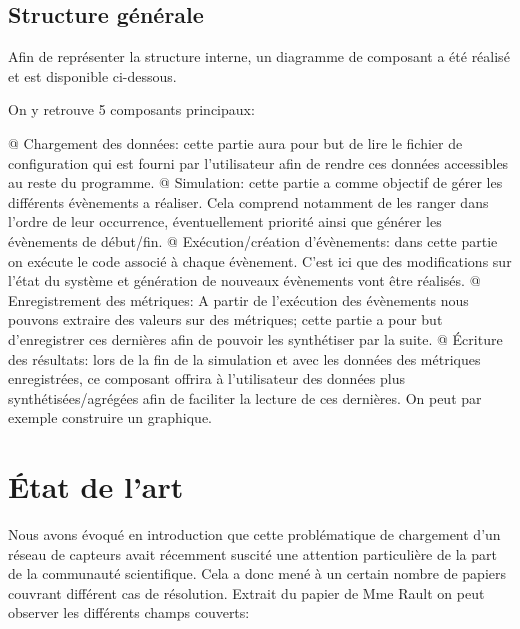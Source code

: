 \documentclass[final]{polytech/polytech}
\begin{document}
			
	\section{Structure générale}
		Afin de représenter la structure interne, un diagramme de composant a été réalisé et est disponible ci-dessous.
		
		
		On y retrouve 5 composants principaux:
		\begin{easylist}[itemize]
			@ Chargement des données: cette partie aura pour but de lire le fichier de configuration qui est fourni par l'utilisateur afin de rendre ces données accessibles au reste du programme.
			@ Simulation: cette partie a comme objectif de gérer les différents évènements a réaliser. Cela comprend notamment de les ranger dans l'ordre de leur occurrence, éventuellement priorité ainsi que générer les évènements de début/fin.
			@ Exécution/création d'évènements: dans cette partie on exécute le code associé à chaque évènement. C'est ici que des modifications sur l'état du système et génération de nouveaux évènements vont être réalisés.
			@ Enregistrement des métriques: A partir de l'exécution des évènements nous pouvons extraire des valeurs sur des métriques; cette partie a pour but d'enregistrer ces dernières afin de pouvoir les synthétiser par la suite.
			@ Écriture des résultats: lors de la fin de la simulation et avec les données des métriques enregistrées, ce composant offrira à l'utilisateur des données plus synthétisées/agrégées afin de faciliter la lecture de ces dernières. On peut par exemple construire un graphique.	
		\end{easylist}

\chapter{État de l'art}
	Nous avons évoqué en introduction que cette problématique de chargement d'un réseau de capteurs avait récemment suscité une attention particulière de la part de la communauté scientifique.
	Cela a donc mené à un certain nombre de papiers couvrant différent cas de résolution.
	Extrait du papier de Mme Rault \cite{Rault:chargers} on peut observer les différents champs couverts:
	
\end{document}
